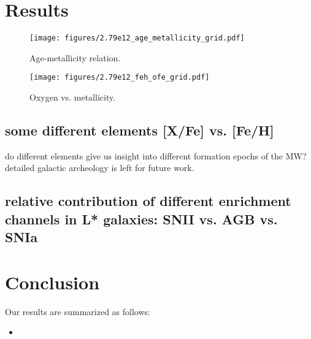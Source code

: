 \documentclass[useAMS,usenatbib]{mnras}
\begin{document}
\section{Results} \label{sec:results}


\begin{figure*}
    \begin{centering}
        \texttt{[image: figures/2.79e12\_age\_metallicity\_grid.pdf]}
        \caption{
            Age-metallicity relation.
        }
        \label{fig:age_feh}
    \end{centering}
\end{figure*}

\begin{figure*}
    \begin{centering}
        \texttt{[image: figures/2.79e12\_feh\_ofe\_grid.pdf]}
        \caption{
            Oxygen vs. metallicity.
        }
        \label{fig:ofe_feh}
    \end{centering}
\end{figure*}







\subsection{some different elements [X/Fe] vs. [Fe/H]}
do different elements give us insight into different formation epochs of the MW?
detailed galactic archeology is left for future work.

\subsection{relative contribution of different enrichment channels in L* galaxies: SNII vs. AGB vs. SNIa}


\section{Conclusion}
\label{sec:conclusion}



Our results are summarized as follows:
\begin{itemize}
%
\item 

\end{itemize}
\end{document}
